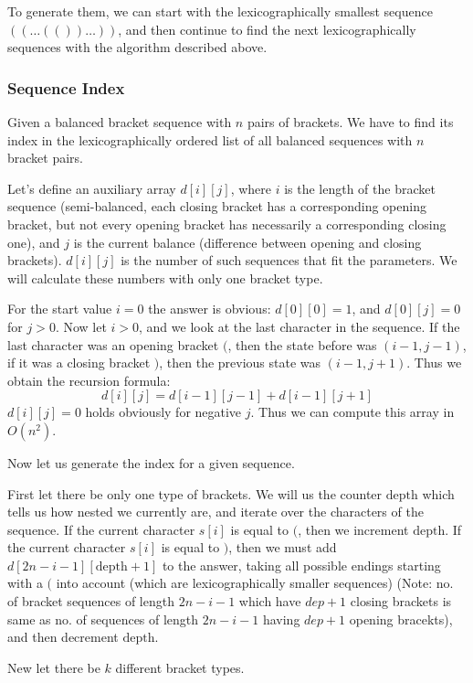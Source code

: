 \documentclass[8pt, a4paper, oneside, twocolumn]{extarticle}
\begin{document}
To generate them, we can start with the lexicographically smallest sequence $((\dots(())\dots))$, and then continue to find the next lexicographically sequences with the algorithm described above. 
\subsubsection{Sequence Index}
Given a balanced bracket sequence with $n$ pairs of brackets. We have to find its index in the lexicographically ordered list of all balanced sequences with $n$ bracket pairs.

Let's define an auxiliary array $d[i][j]$, where $i$ is the length of the bracket sequence (semi-balanced, each closing bracket has a corresponding opening bracket, but not every opening bracket has necessarily a corresponding closing one), and $j$ is the current balance (difference between opening and closing brackets). $d[i][j]$ is the number of such sequences that fit the parameters. We will calculate these numbers with only one bracket type.

For the start value $i = 0$ the answer is obvious: $d[0][0] = 1$, and $d[0][j] = 0$ for $j > 0$. Now let $i > 0$, and we look at the last character in the sequence. If the last character was an opening bracket $($, then the state before was $(i-1, j-1)$, if it was a closing bracket $)$, then the previous state was $(i-1, j+1)$. Thus we obtain the recursion formula: $$d[i][j] = d[i-1][j-1] + d[i-1][j+1]$$ $d[i][j] = 0$ holds obviously for negative $j$. Thus we can compute this array in $O(n^2)$.

Now let us generate the index for a given sequence.

First let there be only one type of brackets. We will us the counter $\text{depth}$ which tells us how nested we currently are, and iterate over the characters of the sequence. If the current character $s[i]$ is equal to $($, then we increment $\text{depth}$. If the current character $s[i]$ is equal to $)$, then we must add $d[2n-i-1][\text{depth}+1]$ to the answer, taking all possible endings starting with a $($ into account (which are lexicographically smaller sequences) (Note: no. of bracket sequences of length $2n - i - 1$ which have $dep + 1$ closing brackets is same as no. of sequences of length $2n - i - 1$ having $dep + 1$ opening bracekts), and then decrement $\text{depth}$.

New let there be $k$ different bracket types.
\end{document}
